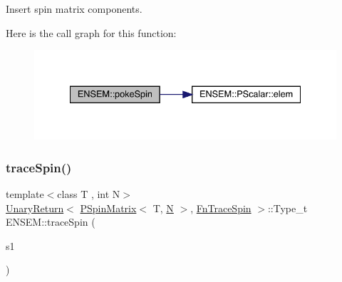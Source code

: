 Insert spin matrix components. 

Here is the call graph for this function\+:\nopagebreak
\begin{figure}[H]
\begin{center}
\leavevmode
\includegraphics[width=334pt]{d6/df5/group__primspinmatrix_ga79a215ef6e9982decb24addd77e93dae_cgraph}
\end{center}
\end{figure}
\mbox{\label{group__primspinmatrix_gaf2ad1f1c91e0de897096d4164e090641}} 
\subsubsection{\texorpdfstring{traceSpin()}{traceSpin()}}
{\footnotesize\ttfamily template$<$class T , int N$>$ \\
\mbox{\hyperlink{structENSEM_1_1UnaryReturn}{Unary\+Return}}$<$ \mbox{\hyperlink{classENSEM_1_1PSpinMatrix}{P\+Spin\+Matrix}}$<$ T, \mbox{\hyperlink{adat__devel_2lib_2hadron_2operator__name__util_8cc_a7722c8ecbb62d99aee7ce68b1752f337}{N}} $>$, \mbox{\hyperlink{structENSEM_1_1FnTraceSpin}{Fn\+Trace\+Spin}} $>$\+::Type\+\_\+t E\+N\+S\+E\+M\+::trace\+Spin (\begin{DoxyParamCaption}\item[{const \mbox{\hyperlink{classENSEM_1_1PSpinMatrix}{P\+Spin\+Matrix}}$<$ T, \mbox{\hyperlink{adat__devel_2lib_2hadron_2operator__name__util_8cc_a7722c8ecbb62d99aee7ce68b1752f337}{N}} $>$ \&}]{s1 }\end{DoxyParamCaption})\hspace{0.3cm}{\ttfamily [inline]}}

\mbox{\label{group__primspinmatrix_gab5c053ea22b374090822742e46ebd402}} 
